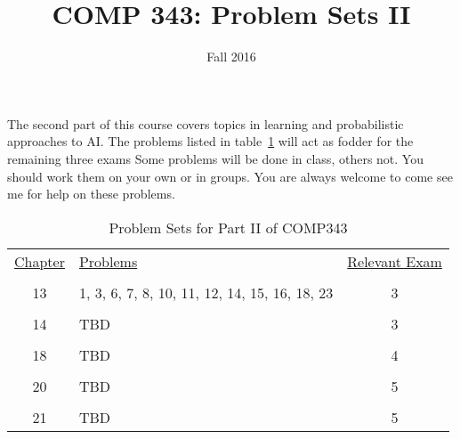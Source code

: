 \documentclass[nobib]{tufte-handout}
\title{COMP 343: Problem Sets II}
\author{  }
\date{Fall 2016}
\begin{document}
\maketitle

The second part of this course covers topics in learning and probabilistic approaches to AI\@.  The problems listed in table~\ref{probs} will act as fodder for the remaining three exams  Some problems will be done in class, others not. You should work them on your own or in groups. You are always welcome to come see me for help on these problems.

\begin{table}[!ht]
\begin{center}
\begin{tabular}{clc}
  \underline{Chapter} & \underline{Problems} & \underline{Relevant Exam} \\ \\
   13 & 1, 3, 6, 7, 8, 10, 11, 12, 14, 15, 16, 18, 23 & 3 \\ \\
   14 & TBD & 3 \\ \\
   18 & TBD & 4 \\ \\
   20 & TBD & 5 \\ \\
   21 & TBD & 5
\end{tabular}
\end{center}
\caption{Problem Sets for Part II of COMP343}
\label{probs}
\end{table}
\end{document}
